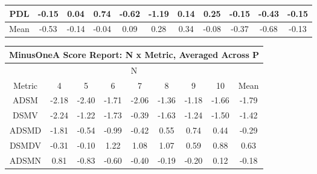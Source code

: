 \begin{longtable}{ | c || c | c | c | c | c | c | c | c | c || c |}
PDL &  \cellcolor[HTML]{FFFFFF} -0.15 &  \cellcolor[HTML]{FFFFFF} 0.04 &  \cellcolor[HTML]{EFEFFF} 0.74 &  \cellcolor[HTML]{FFEFEF} -0.62 &  \cellcolor[HTML]{FFDFDF} -1.19 &  \cellcolor[HTML]{FFFFFF} 0.14 &  \cellcolor[HTML]{F7F7FF} 0.25 &  \cellcolor[HTML]{FFFFFF} -0.15 &  \cellcolor[HTML]{FFF7F7} -0.43 &  \cellcolor[HTML]{FFFFFF} -0.15 \\
\hline
\hline
Mean  &  \cellcolor[HTML]{FFEFEF} -0.53 &  \cellcolor[HTML]{FFFFFF} -0.14 &  \cellcolor[HTML]{FFFFFF} -0.04 &  \cellcolor[HTML]{FFFFFF} 0.09 &  \cellcolor[HTML]{F7F7FF} 0.28 &  \cellcolor[HTML]{F7F7FF} 0.34 &  \cellcolor[HTML]{FFFFFF} -0.08 &  \cellcolor[HTML]{FFF7F7} -0.37 &  \cellcolor[HTML]{FFEFEF} -0.68 &  \cellcolor[HTML]{FFFFFF} -0.13 \\
\hline
\end{longtable}
\begin{longtable}{ | c || c | c | c | c | c | c | c || c |}
\hline
\multicolumn{9}{|c|}{ MinusOneA Score Report: N x Metric, Averaged Across P } \\
\hline
\multicolumn{9}{|c|}{ N } \\
\hline
Metric & 4 & 5 & 6 & 7 & 8 & 9 & 10 & Mean\\
\hline
\hline
\endhead
ADSM &  \cellcolor[HTML]{FFC7C7} -2.18 &  \cellcolor[HTML]{FFBFBF} -2.40 &  \cellcolor[HTML]{FFD7D7} -1.71 &  \cellcolor[HTML]{FFCFCF} -2.06 &  \cellcolor[HTML]{FFDFDF} -1.36 &  \cellcolor[HTML]{FFDFDF} -1.18 &  \cellcolor[HTML]{FFD7D7} -1.66 &  \cellcolor[HTML]{FFCFCF} -1.79 \\
DSMV &  \cellcolor[HTML]{FFC7C7} -2.24 &  \cellcolor[HTML]{FFDFDF} -1.22 &  \cellcolor[HTML]{FFD7D7} -1.73 &  \cellcolor[HTML]{FFF7F7} -0.39 &  \cellcolor[HTML]{FFD7D7} -1.63 &  \cellcolor[HTML]{FFDFDF} -1.24 &  \cellcolor[HTML]{FFD7D7} -1.50 &  \cellcolor[HTML]{FFDFDF} -1.42 \\
ADSMD &  \cellcolor[HTML]{FFCFCF} -1.81 &  \cellcolor[HTML]{FFEFEF} -0.54 &  \cellcolor[HTML]{FFE7E7} -0.99 &  \cellcolor[HTML]{FFF7F7} -0.42 &  \cellcolor[HTML]{EFEFFF} 0.55 &  \cellcolor[HTML]{EFEFFF} 0.74 &  \cellcolor[HTML]{F7F7FF} 0.44 &  \cellcolor[HTML]{FFF7F7} -0.29 \\
DSMDV &  \cellcolor[HTML]{FFF7F7} -0.31 &  \cellcolor[HTML]{FFFFFF} -0.10 &  \cellcolor[HTML]{DFDFFF} 1.22 &  \cellcolor[HTML]{E7E7FF} 1.08 &  \cellcolor[HTML]{E7E7FF} 1.07 &  \cellcolor[HTML]{EFEFFF} 0.59 &  \cellcolor[HTML]{E7E7FF} 0.88 &  \cellcolor[HTML]{EFEFFF} 0.63 \\
ADSMN &  \cellcolor[HTML]{E7E7FF} 0.81 &  \cellcolor[HTML]{FFE7E7} -0.83 &  \cellcolor[HTML]{FFEFEF} -0.60 &  \cellcolor[HTML]{FFF7F7} -0.40 &  \cellcolor[HTML]{FFF7F7} -0.19 &  \cellcolor[HTML]{FFF7F7} -0.20 &  \cellcolor[HTML]{FFFFFF} 0.12 &  \cellcolor[HTML]{FFF7F7} -0.18 \\

\end{longtable}
